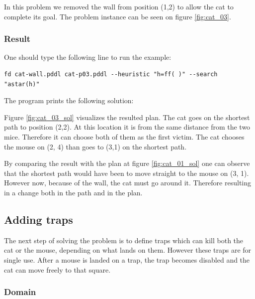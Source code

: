 In this problem we removed the wall from position (1,2) to allow the cat to complete its goal. The problem instance can be seen on figure \ref{fig:cat_03}.




\subsubsection{Result}

One should type the following line to run the example: 

\begin{lstlisting}[numbers=none]
fd cat-wall.pddl cat-p03.pddl --heuristic "h=ff( )" --search "astar(h)"
\end{lstlisting}

The program prints the following solution:



Figure \ref{fig:cat_03_sol} visualizes the resulted plan. The cat goes on the shortest path to position (2,2). At this location it is from the same distance from the two mice. Therefore it can choose both of them as the first victim. The cat chooses the mouse on (2, 4) than goes to (3,1) on the shortest path. 

By comparing the result with the plan at figure \ref{fig:cat_01_sol} one can observe that the shortest path would have been to move straight to the mouse on (3, 1). However now, because of the wall, the cat must go around it. Therefore resulting in a change both in the path and in the plan.









\subsection{Adding traps}

The next step of solving the problem is to define traps which can kill both the cat or the mouse, depending on what lands on them. However these traps are for single use. After a mouse is landed on a trap, the trap becomes disabled and the cat can move freely to that square.


\subsubsection{Domain}

